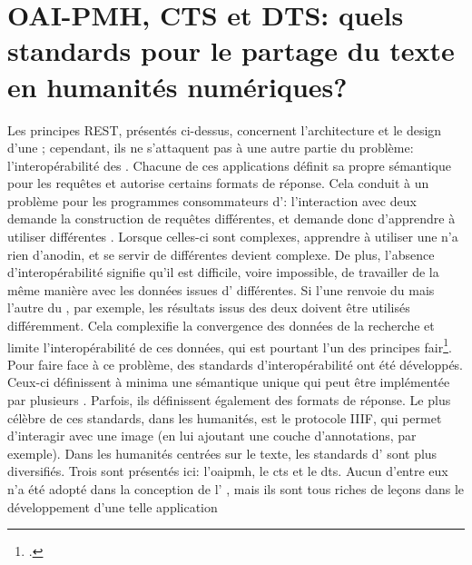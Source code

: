\section{OAI-PMH, CTS et DTS: quels standards pour le partage du texte en humanités numériques?}
Les principes REST, présentés ci-dessus, concernent l'architecture et le design d'une \api{}; cependant, ils ne s'attaquent pas à une autre partie du problème: l'interopérabilité des \api{}. Chacune de ces applications définit sa propre sémantique pour les requêtes et autorise certains formats de réponse. Cela conduit à un problème pour les programmes consommateurs d'\api{}: l'interaction avec deux \api{} demande la construction de requêtes différentes, et demande donc d'apprendre à utiliser différentes \api{}. Lorsque celles-ci sont complexes, apprendre à utiliser une \api{} n'a rien d'anodin, et se servir de différentes \api{} devient complexe. De plus, l'absence d'interopérabilité signifie qu'il est difficile, voire impossible, de travailler de la même manière avec les données issues d'\api{} différentes. Si l'une renvoie du \json{} mais l'autre du \xml{}, par exemple, les résultats issus des deux \api{} doivent être utilisés différemment. Cela complexifie la convergence des données de la recherche et limite l'interopérabilité de ces données, qui est pourtant l'un des principes \gls{fair}\footcite[p. 932-933]{boeckhout_fair_2018}. Pour faire face à ce problème, des standards d'interopérabilité ont été développés. Ceux-ci définissent à minima une sémantique unique qui peut être implémentée par plusieurs \api{}. Parfois, ils définissent également des formats de réponse. Le plus célèbre de ces standards, dans les humanités, est le protocole IIIF, qui permet d'interagir avec une image (en lui ajoutant une couche d'annotations, par exemple). Dans les humanités centrées sur le texte, les standards d'\api{} sont plus diversifiés. Trois sont présentés ici: l'\gls{oaipmh}, le \gls{cts} et le \gls{dts}. Aucun d'entre eux n'a été adopté dans la conception de l'\api{} \ktb{}, mais ils sont tous riches de leçons dans le développement d'une telle application

